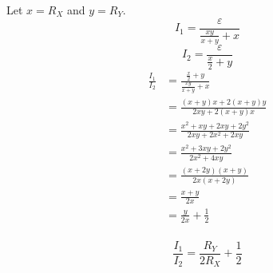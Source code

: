 \documentclass[a4paper]{article}
\begin{document}
Let \(x=R_X\) and \(y=R_Y\).
\[I_1=\frac\varepsilon{\frac{xy}{x+y}+x}\]
\[I_2=\frac\varepsilon{\frac x2+y}\]
\[\begin{aligned}
    \frac{I_1}{I_2}&=\frac{\frac x2+y}{\frac{xy}{x+y}+x}\\
    &=\frac{(x+y)x+2(x+y)y}{2xy+2(x+y)x}\\
    &=\frac{x^2+xy+2xy+2y^2}{2xy+2x^2+2xy}\\
    &=\frac{x^2+3xy+2y^2}{2x^2+4xy}\\
    &=\frac{(x+2y)(x+y)}{2x(x+2y)}\\
    &=\frac{x+y}{2x}\\
    &=\frac{y}{2x}+\frac12\\
\end{aligned}\]

\[\boxed{\frac{I_1}{I_2}=\frac{R_Y}{2R_X}+\frac12}\]
\end{document}
